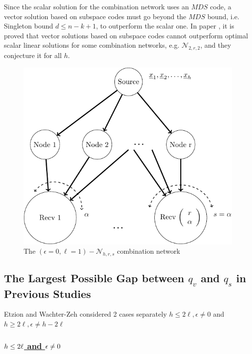 Since the scalar solution for the combination network uses an $MDS$
code, a vector solution based on subspace codes must go beyond the
$MDS$ bound, i.e. Singleton bound $d\leq n-k+1$, to outperform the
scalar one. In paper \cite[Sec. IV-A, Sec. IX-1,2]{Wachter-Zeh:2018},
it is proved that vector solutions based on subspace codes cannot
outperform optimal scalar linear solutions for some combination networks,
e.g. $\mathcal{N}_{2,r,2}$, and they conjecture it for all $h$.
\begin{figure}[H]
\caption{The $\left(\epsilon=0,\ell=1\right)-\mathcal{N}_{h,r,s}$ combination
network \label{fig:network_special4}}

\centering{}\includegraphics[width=0.4\paperwidth]{./figures/nw_special4_combination}
\end{figure}


\subsection{The Largest Possible Gap between $q_{v}$ and $q_{s}$ in Previous
Studies}

Etzion and Wachter-Zeh considered 2 cases separately $h\leq2\ell,\epsilon\neq0$
and $h\geq2\ell,\epsilon\neq h-2\ell$

\subsubsection{\uline{\mbox{$h\protect\leq2\ell$} and \mbox{$\epsilon\protect\neq0$}}}

